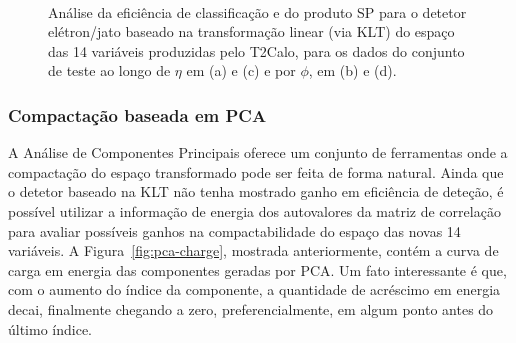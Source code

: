 \begin{figure}
\begin{center}
\mbox{%
}
\mbox{%
}
\end{center}
\caption{Análise da eficiência de classificação e do produto SP para 
o detetor elétron/jato baseado na transformação linear (via KLT) do espaço das
14 variáveis produzidas pelo T2Calo, para os dados do conjunto de teste ao
longo de $\eta$ em (a) e (c) e por $\phi$, em (b) e (d).}
\label{fig:pca-eta-phi}
\end{figure}




\subsubsection{Compactação baseada em PCA}

A Análise de Componentes Principais oferece um conjunto de ferramentas onde a
compactação do espaço transformado pode ser feita de forma natural. Ainda que
o detetor baseado na KLT não tenha mostrado ganho em eficiência de deteção, é
possível utilizar a informação de energia dos autovalores da matriz de
correlação para avaliar possíveis ganhos na compactabilidade do espaço das
novas 14 variáveis. A Figura~\ref{fig:pca-charge}, mostrada anteriormente,
contém a curva de carga em energia das componentes geradas por PCA. Um fato
interessante é que, com o aumento do índice da componente, a quantidade de
acréscimo em energia decai, finalmente chegando a zero, preferencialmente, em
algum ponto antes do último índice.

